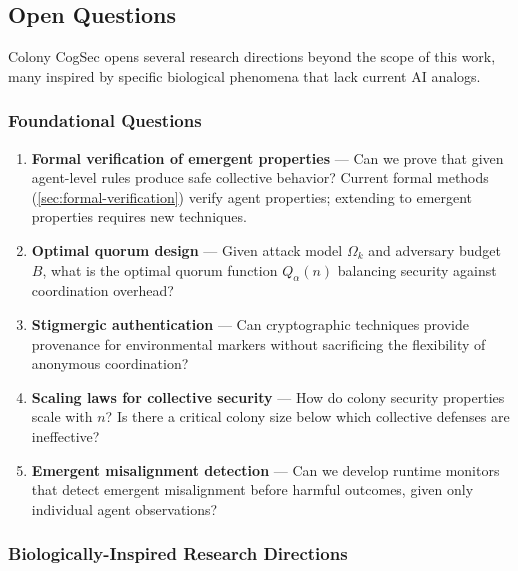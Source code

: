 \documentclass[
]{article}
\begin{document}
\subsection{Open Questions}\label{sec:eusocial-open-questions}

Colony CogSec opens several research directions beyond the scope of this
work, many inspired by specific biological phenomena that lack current
AI analogs.

\subsubsection{Foundational Questions}\label{foundational-questions}

\begin{enumerate}
\def\labelenumi{\arabic{enumi}.}
\item
  \textbf{Formal verification of emergent properties} --- Can we prove
  that given agent-level rules produce safe collective behavior? Current
  formal methods (\cref{sec:formal-verification}) verify agent
  properties; extending to emergent properties requires new techniques.
\item
  \textbf{Optimal quorum design} --- Given attack model \(\Omega_k\) and
  adversary budget \(B\), what is the optimal quorum function
  \(Q_\alpha(n)\) balancing security against coordination overhead?
\item
  \textbf{Stigmergic authentication} --- Can cryptographic techniques
  provide provenance for environmental markers without sacrificing the
  flexibility of anonymous coordination?
\item
  \textbf{Scaling laws for collective security} --- How do colony
  security properties scale with \(n\)? Is there a critical colony size
  below which collective defenses are ineffective?
\item
  \textbf{Emergent misalignment detection} --- Can we develop runtime
  monitors that detect emergent misalignment before harmful outcomes,
  given only individual agent observations?
\end{enumerate}

\subsubsection{Biologically-Inspired Research
Directions}\label{biologically-inspired-research-directions}
\end{document}
